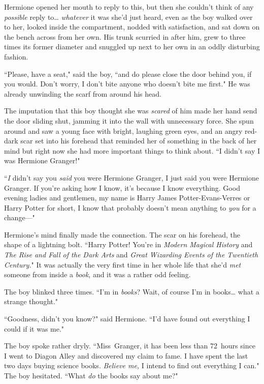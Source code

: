 Hermione opened her mouth to reply to this, but then she couldn't think of any \emph{possible} reply to{\ldots} \emph{whatever} it was she'd just heard, even as the boy walked over to her, looked inside the compartment, nodded with satisfaction, and sat down on the bench across from her own. His trunk scurried in after him, grew to three times its former diameter and snuggled up next to her own in an oddly disturbing fashion.

``Please, have a seat," said the boy, ``and do please close the door behind you, if you would. Don't worry, I don't bite anyone who doesn't bite me first." He was already unwinding the scarf from around his head.

The imputation that this boy thought she was \emph{scared} of him made her hand send the door sliding shut, jamming it into the wall with unnecessary force. She spun around and saw a young face with bright, laughing green eyes, and an angry red-dark scar set into his forehead that reminded her of something in the back of her mind but right now she had more important things to think about. ``I didn't say I was Hermione Granger!"

``\emph{I} didn't say you \emph{said} you were Hermione Granger, I just said you were Hermione Granger. If you're asking how I know, it's because I know everything. Good evening ladies and gentlemen, my name is Harry James Potter-Evans-Verres or Harry Potter for short, I know that probably doesn't mean anything to \emph{you} for a change—"

Hermione's mind finally made the connection. The scar on his forehead, the shape of a lightning bolt. ``Harry Potter! You're in \emph{Modern Magical History} and \emph{The Rise and Fall of the Dark Arts} and \emph{Great Wizarding Events of the Twentieth Century.}" It was actually the very first time in her whole life that she'd \emph{met} someone from inside a \emph{book}, and it was a rather odd feeling.

The boy blinked three times. ``I'm in \emph{books}? Wait, of course I'm in books{\ldots} what a strange thought."

``Goodness, didn't you know?" said Hermione. ``I'd have found out everything I could if it was me."

The boy spoke rather dryly. ``Miss~Granger, it has been less than 72~hours since I went to Diagon Alley and discovered my claim to fame. I have spent the last two days buying science books. \emph{Believe me,} I intend to find out everything I can." The boy hesitated. ``What \emph{do} the books say about me?"

